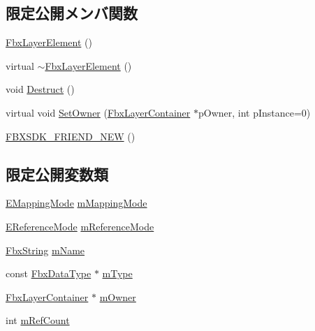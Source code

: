 \subsection*{限定公開メンバ関数}
\begin{DoxyCompactItemize}
\item 
\hyperlink{class_fbx_layer_element_aa7d11ce8bf1766a2225d7f6b653c4ece}{Fbx\+Layer\+Element} ()
\item 
virtual \hyperlink{class_fbx_layer_element_a291502ffa72d9feed2e31813471f6a46}{$\sim$\+Fbx\+Layer\+Element} ()
\item 
void \hyperlink{class_fbx_layer_element_a18763978aa1301d695390a1a2e4a1eec}{Destruct} ()
\item 
virtual void \hyperlink{class_fbx_layer_element_ab4740c4774c0600f91515fb2c022f0ef}{Set\+Owner} (\hyperlink{class_fbx_layer_container}{Fbx\+Layer\+Container} $\ast$p\+Owner, int p\+Instance=0)
\item 
\hyperlink{class_fbx_layer_element_ace07aa541a334c865247ff8793ac1b16}{F\+B\+X\+S\+D\+K\+\_\+\+F\+R\+I\+E\+N\+D\+\_\+\+N\+EW} ()
\end{DoxyCompactItemize}
\subsection*{限定公開変数類}
\begin{DoxyCompactItemize}
\item 
\hyperlink{class_fbx_layer_element_a5a40e95db30ae9f94611dc3f1568af26}{E\+Mapping\+Mode} \hyperlink{class_fbx_layer_element_a3fb1be862396ae7716fe2a1935197ef4}{m\+Mapping\+Mode}
\item 
\hyperlink{class_fbx_layer_element_a00f04654580ca9b2f5d292c11abd83fc}{E\+Reference\+Mode} \hyperlink{class_fbx_layer_element_a6b4c1f36ba113330cbfbd534ed74363f}{m\+Reference\+Mode}
\item 
\hyperlink{class_fbx_string}{Fbx\+String} \hyperlink{class_fbx_layer_element_a11749a38f06c531163b5889f95b87418}{m\+Name}
\item 
const \hyperlink{class_fbx_data_type}{Fbx\+Data\+Type} $\ast$ \hyperlink{class_fbx_layer_element_a062940cef629ccfeb464fe88caa5bdcf}{m\+Type}
\item 
\hyperlink{class_fbx_layer_container}{Fbx\+Layer\+Container} $\ast$ \hyperlink{class_fbx_layer_element_a30cec55ccd979c6715e935dbbc68c7a1}{m\+Owner}
\item 
int \hyperlink{class_fbx_layer_element_a78a94fc56ae2687184a4d620118a6387}{m\+Ref\+Count}
\end{DoxyCompactItemize}
